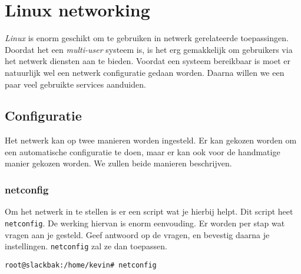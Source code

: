 %
%
%
%

\chapter{Linux networking}\label{h.netwerk}
\emph{Linux} is enorm geschikt om te gebruiken in netwerk gerelateerde toepassingen. Doordat het een \emph{multi-user} systeem is, is het erg gemakkelijk om gebruikers via het netwerk diensten aan te bieden. Voordat een systeem bereikbaar is moet er natuurlijk wel een netwerk configuratie gedaan worden. Daarna willen we een paar veel gebruikte services aanduiden. 

\section{Configuratie}
Het netwerk kan op twee manieren worden ingesteld. Er kan gekozen worden om een automatische configuratie te doen, maar er kan ook voor de handmatige manier gekozen worden. We zullen beide manieren beschrijven. 

\subsection{netconfig}
Om het netwerk in te stellen is er een script wat je hierbij helpt. Dit script heet \texttt{netconfig}. De werking hiervan is enorm eenvouding. Er worden per stap wat vragen aan je gesteld. Geef antwoord op de vragen, en bevestig daarna je instellingen. \texttt{netconfig} zal ze dan toepassen.
\begin{lstlisting}
root@slackbak:/home/kevin# netconfig
\end{lstlisting}

